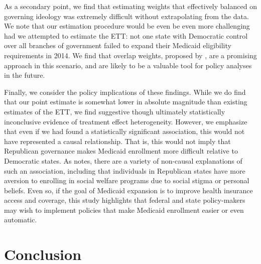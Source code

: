 \documentclass[aoas]{imsart}
\theoremstyle{plain}
\theoremstyle{remark}
\begin{document}
As a secondary point, we find that estimating weights that effectively balanced on governing ideology was extremely difficult without extrapolating from the data. We note that our estimation procedure would be even be even more challenging had we attempted to estimate the ETT: not one state with Democratic control over all branches of government failed to expand their Medicaid eligibility requirements in 2014. We find that overlap weights, proposed by \cite{li2018balancing}, are a promising approach in this scenario, and are likely to be a valuable tool for policy analyses in the future.

Finally, we consider the policy implications of these findings. While we do find that our point estimate is somewhat lower in absolute magnitude than existing estimates of the ETT, we find suggestive though ultimately statistically inconclusive evidence of treatment effect heterogeneity. However, we emphasize that even if we had found a statistically significant association, this would not have represented a causal relationship. That is, this would not imply that Republican governance makes Medicaid enrollment more difficult relative to Democratic states. As \cite{sommers2012understanding} notes, there are a variety of non-causal explanations of such an association, including that individuals in Republican states have more aversion to enrolling in social welfare programs due to social stigma or personal beliefs. Even so, if the goal of Medicaid expansion is to improve health insurance access and coverage, this study highlights that federal and state policy-makers may wish to implement policies that make Medicaid enrollment easier or even automatic. 

\section{Conclusion}
\end{document}
